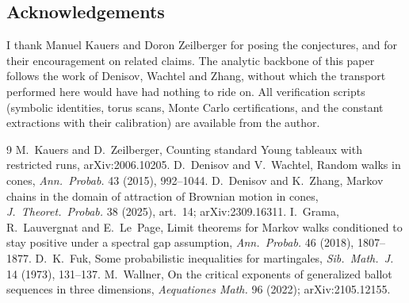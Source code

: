 \documentclass[11pt]{article}
\begin{document}
\subsection*{Acknowledgements}
I thank Manuel Kauers and Doron Zeilberger for posing the conjectures, and for their
encouragement on related claims. The analytic backbone of this paper follows the work of
Denisov, Wachtel and Zhang, without which the transport performed here would have had
nothing to ride on. All verification scripts (symbolic identities, torus scans,
Monte Carlo certifications, and the constant extractions with their calibration) are
available from the author.

\begin{thebibliography}{9}
 M.~Kauers and D.~Zeilberger, Counting standard Young tableaux with restricted
runs, arXiv:2006.10205.
 D.~Denisov and V.~Wachtel, Random walks in cones, \emph{Ann.\ Probab.} 43
(2015), 992--1044.
 D.~Denisov and K.~Zhang, Markov chains in the domain of attraction of Brownian
motion in cones, \emph{J.\ Theoret.\ Probab.} 38 (2025), art.~14; arXiv:2309.16311.
 I.~Grama, R.~Lauvergnat and E.~Le~Page, Limit theorems for Markov walks
conditioned to stay positive under a spectral gap assumption, \emph{Ann.\ Probab.} 46
(2018), 1807--1877.
 D.~K.~Fuk, Some probabilistic inequalities for martingales, \emph{Sib.\ Math.\
J.} 14 (1973), 131--137.
 M.~Wallner, On the critical exponents of generalized ballot sequences in
three dimensions, \emph{Aequationes Math.} 96 (2022); arXiv:2105.12155.
\end{thebibliography}
\end{document}
